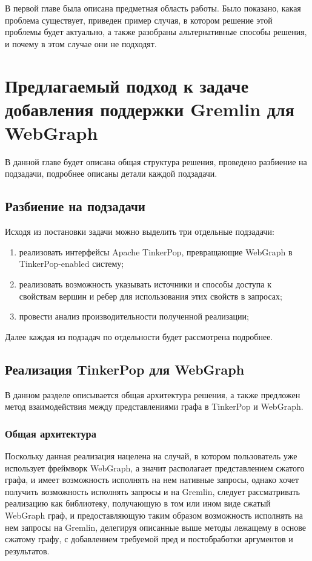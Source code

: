 \documentclass[times,specification,annotation]{itmo-student-thesis}
\begin{document}
\finishrelatedwork

\chapterconclusion
В первой главе была описана предметная область работы. Было показано, какая проблема существует, приведен пример случая, в котором решение этой проблемы будет актуально, а также разобраны альтернативные способы решения, и почему в этом случае они не подходят.

\chapter{Предлагаемый подход к задаче добавления поддержки Gremlin для WebGraph}

В данной главе будет описана общая структура решения, проведено разбиение на подзадачи, подробнее описаны детали каждой подзадачи. 

\section{Разбиение на подзадачи}

Исходя из постановки задачи можно выделить три отдельные подзадачи:

\begin{enumerate}
    \item реализовать интерфейсы Apache TinkerPop, превращающие WebGraph в TinkerPop-enabled систему;
    \item реализовать возможность указывать источники и способы доступа к свойствам вершин и ребер для использования этих свойств в запросах;
    \item провести анализ производительности полученной реализации;
\end{enumerate}

Далее каждая из подзадач по отдельности будет рассмотрена подробнее.

\section{Реализация TinkerPop для WebGraph}

В данном разделе описывается общая архитектура решения, а также предложен метод взаимодействия между представлениями графа в TinkerPop и WebGraph.

\subsection{Общая архитектура}

Поскольку данная реализация нацелена на случай, в котором пользователь уже использует фреймворк WebGraph, а значит располагает представлением сжатого графа, и имеет возможность исполнять на нем нативные запросы, однако хочет получить возможность исполнять запросы и на Gremlin, следует рассматривать реализацию как библиотеку, получающую в том или ином виде сжатый WebGraph граф, и предоставляющую таким образом возможность исполнять на нем запросы на Gremlin, делегируя описанные выше методы лежащему в основе сжатому графу, с добавлением требуемой пред и постобработки аргументов и результатов.
\end{document}
